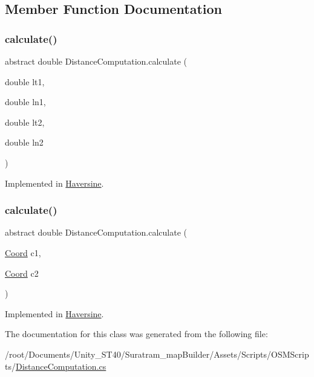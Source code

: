 \subsection{Member Function Documentation}
\mbox{\label{classDistanceComputation_a846f5563a7add26c3fb4bbb988ac24ca}} 
\subsubsection{\texorpdfstring{calculate()}{calculate()}\hspace{0.1cm}{\footnotesize\ttfamily [1/2]}}
{\footnotesize\ttfamily abstract double Distance\+Computation.\+calculate (\begin{DoxyParamCaption}\item[{double}]{lt1,  }\item[{double}]{ln1,  }\item[{double}]{lt2,  }\item[{double}]{ln2 }\end{DoxyParamCaption})\hspace{0.3cm}{\ttfamily [pure virtual]}}



Implemented in \hyperlink{classHaversine_a63973b82d76e151b9f55b0dbdb005e47}{Haversine}.

\mbox{\label{classDistanceComputation_ad735d72f479e7114a528b3404ea83a33}} 
\subsubsection{\texorpdfstring{calculate()}{calculate()}\hspace{0.1cm}{\footnotesize\ttfamily [2/2]}}
{\footnotesize\ttfamily abstract double Distance\+Computation.\+calculate (\begin{DoxyParamCaption}\item[{\hyperlink{structCoord}{Coord}}]{c1,  }\item[{\hyperlink{structCoord}{Coord}}]{c2 }\end{DoxyParamCaption})\hspace{0.3cm}{\ttfamily [pure virtual]}}



Implemented in \hyperlink{classHaversine_a8a29bca501391b8877510d832a90d384}{Haversine}.



The documentation for this class was generated from the following file\+:\begin{DoxyCompactItemize}
\item 
/root/\+Documents/\+Unity\+\_\+\+S\+T40/\+Suratram\+\_\+map\+Builder/\+Assets/\+Scripts/\+O\+S\+M\+Scripts/\hyperlink{DistanceComputation_8cs}{Distance\+Computation.\+cs}\end{DoxyCompactItemize}
